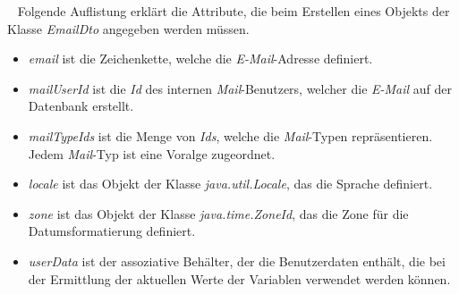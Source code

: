\ \newline
Folgende Auflistung erklärt die Attribute, die beim Erstellen eines Objekts der Klasse \emph{EmailDto} angegeben werden müssen.
\begin{itemize}
	\item\emph{email}
	\newline
	ist die Zeichenkette, welche die \emph{E-Mail}-Adresse definiert.
	\item\emph{mailUserId}
	\newline
	ist die \emph{Id} des internen \emph{Mail}-Benutzers, welcher die \emph{E-Mail} auf der Datenbank erstellt.
	\item\emph{mailTypeIds}
	\newline
	ist die Menge von \emph{Ids}, welche die \emph{Mail}-Typen repräsentieren. Jedem \emph{Mail}-Typ ist eine Voralge zugeordnet.
	\item\emph{locale}
	\newline
	ist das Objekt der Klasse \emph{java.util.Locale}, das die Sprache definiert.
	\item\emph{zone} 
	\newline
	ist das Objekt der Klasse \emph{java.time.ZoneId}, das die Zone für die Datumsformatierung definiert.
	\item\emph{userData} 
	\newline
	ist der assoziative Behälter, der die Benutzerdaten enthält, die bei der Ermittlung der aktuellen Werte der Variablen verwendet werden können.
\end{itemize}
